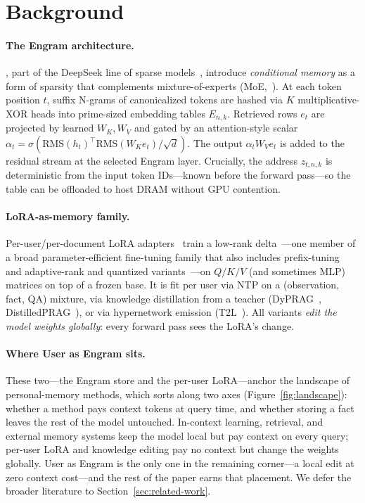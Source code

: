 \documentclass[letterpaper]{article} %
\begin{document}
\section{Background}
\label{sec:background}

\paragraph{The Engram architecture.} \citet{cheng2026engram}, part
of the DeepSeek line of sparse
models~\citep{dai2024deepseekmoe,deepseekai2024v3}, introduce
\emph{conditional memory} as a form of sparsity that complements
mixture-of-experts (MoE,~\citealt{shazeer2017moe,dai2024deepseekmoe}).
At each token position $t$, suffix N-grams of canonicalized tokens are
hashed via $K$ multiplicative-XOR heads into prime-sized embedding
tables $E_{n,k}$. Retrieved rows $e_t$ are projected by learned
$W_K, W_V$ and gated by an attention-style scalar
$\alpha_t = \sigma(\mathrm{RMS}(h_t)^\top \mathrm{RMS}(W_K e_t)/\sqrt{d})$.
The output $\alpha_t W_V e_t$ is added to the residual stream at the
selected Engram layer. Crucially, the address $z_{t,n,k}$ is
deterministic from the input token IDs---known before the forward
pass---so the table can be offloaded to host DRAM without GPU
contention.

\paragraph{LoRA-as-memory family.} Per-user/per-document LoRA
adapters~\citep{su2024prag,tan2024oppu,zhuang2024hydra,t2l2024,
tan2024perpcs,memlora2025} train a low-rank
delta~\citep{hu2022lora,houlsby2019adapters,mangrulkar2022peft}---one
member of a broad parameter-efficient fine-tuning family that also
includes prefix-tuning~\citep{li2021prefix} and adaptive-rank and
quantized variants~\citep{zhang2023adalora,dettmers2023qlora}---on
$Q/K/V$ (and sometimes MLP) matrices on top of a frozen base.
It is fit per user via NTP on a
(observation, fact, QA) mixture,
via knowledge distillation from a teacher
(DyPRAG~\citep{tan2025dyprag},
DistilledPRAG~\citep{distilledprag2025}), or via hypernetwork
emission (T2L~\citep{t2l2024}). All variants \emph{edit the model
weights globally}: every forward pass sees the LoRA's change.

\paragraph{Where User as Engram sits.}
These two---the Engram store and the per-user LoRA---anchor the
landscape of personal-memory methods, which sorts along two axes
(Figure~\ref{fig:landscape}): whether a method pays context tokens at
query time, and whether storing a fact leaves the rest of the model
untouched. In-context learning, retrieval, and external memory systems
keep the model local but pay context on every query; per-user LoRA and
knowledge editing pay no context but change the weights globally. User
as Engram is the only one in the remaining corner---a local edit at
zero context cost---and the rest of the paper earns that placement. We
defer the broader literature to Section~\ref{sec:related-work}.
\end{document}
